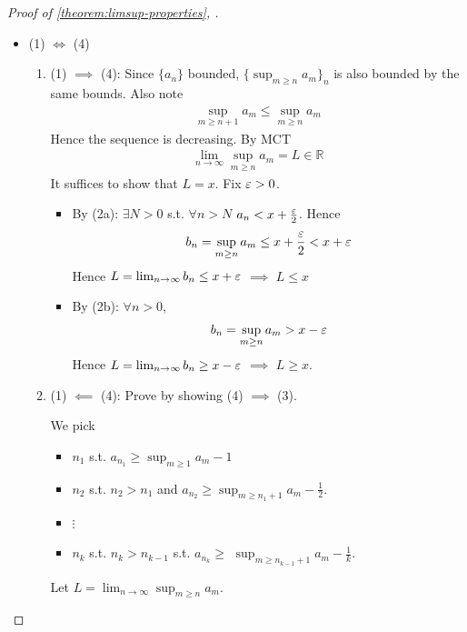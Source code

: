 \begin{proof}[Proof of 
        \ref{theorem:limsup-properties},
    ]
\begin{itemize}
        \item (1) $\iff$ (4)
        \begin{enumerate}
            \item (1) $\implies$ (4): 
            Since $\{ a_n \} $ bounded, 
            $\{ \sup_{m \geq n} a_m\}_n $ is also bounded
            by the same bounds. 
            Also note
            \begin{align*}
                \sup_{m \geq n + 1} a_m \leq
                \sup_{m \geq n} a_m
            \end{align*}
            Hence the sequence is decreasing. 
            By MCT
            \begin{align*}
                \lim_{n \to \infty}
                \sup_{m \geq n} a_m = L \in \mathbb{R}
            \end{align*}
            It suffices to show that $L = x$. 
            Fix $\varepsilon > 0$. 
            \begin{itemize}
                \item By (2a): $\exists N > 0$ s.t. $\forall n > N$
                $a_n < x + \frac{\varepsilon}{2}$. Hence 
                \[
                    b_n = \sup_{m \geq n} a_m \leq 
                    x + \frac{\varepsilon}{2} 
                    < x + \varepsilon
                \]
                Hence $L = \lim_{n \to \infty}b_n \leq x + \varepsilon$
                $\implies$
                $L \leq x$
                \item By (2b): $\forall n > 0$, 
                \begin{align*}
                    b_n = \sup_{m \geq n} a_m > x  - \varepsilon
                \end{align*}
                Hence $L = \lim_{n \to  \infty}b_n \geq x - \varepsilon$
                $\implies$
                $L \geq x$.
            \end{itemize} 
            \item (1) $\impliedby$ (4):
            Prove by showing (4) $\implies$ (3).
            \medskip

            We pick 
            \begin{itemize}
                \item $n_1$ s.t. $a_{n_1} \geq \sup_{m \geq 1} a_m - 1$
                \item $n_2$ s.t. $n_2 > n_1$ and 
                $a_{n_2} \geq \sup_{m \geq n_1 + 1} a_m - \frac{1}{2}$.
                \item $\vdots$
                \item $n_k$ s.t. $n_k > n_{k-1}$ s.t. $a_{n_k} \geq$
                $\sup_{m \geq n_{k-1} + 1} a_m - \frac{1}{k}$.
            \end{itemize} 
            Let $L = \lim_{n \to \infty} \sup_{m \geq n} a_m$.
            \medskip


\end{enumerate}
\end{itemize}
\end{proof}
